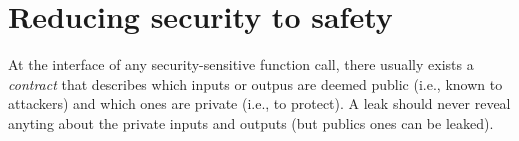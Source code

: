\section{Reducing security to safety}\label{sec:body}





At the interface of any security-sensitive function call, there usually exists a
\emph{contract} that describes which inputs or outpus are deemed public (i.e.,
known to attackers) and which ones are private (i.e., to protect). A leak should
never reveal anyting about the private inputs and outputs (but publics ones 
can be leaked).


